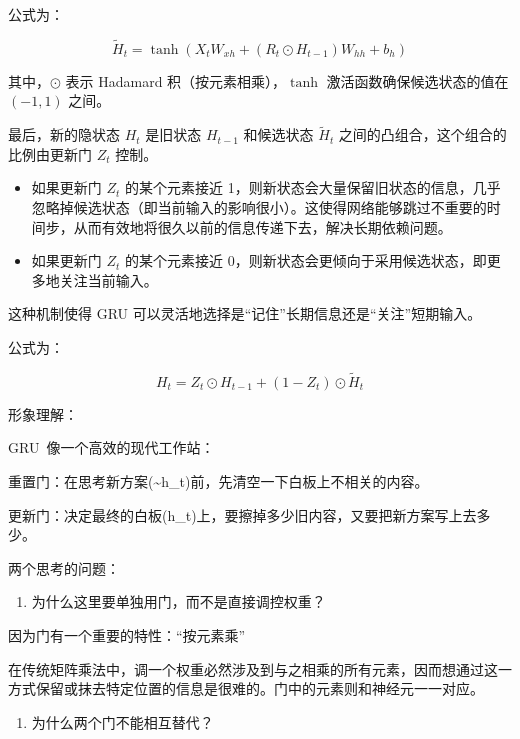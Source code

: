 公式为：

\[
\tilde{H}_t = \tanh(X_t W_{xh} + (R_t \odot H_{t-1})W_{hh} + b_h)
\]

其中，\(\odot\) 表示 Hadamard 积（按元素相乘），\(\tanh\) 激活函数确保候选状态的值在 \((-1, 1)\) 之间。

最后，新的隐状态 \(H_t\) 是旧状态 \(H_{t-1}\) 和候选状态 \(\tilde{H}_t\) 之间的凸组合，这个组合的比例由更新门 \(Z_t\) 控制。

\begin{itemize}
\tightlist
\item
  如果更新门 \(Z_t\) 的某个元素接近 1，则新状态会大量保留旧状态的信息，几乎忽略掉候选状态（即当前输入的影响很小）。这使得网络能够跳过不重要的时间步，从而有效地将很久以前的信息传递下去，解决长期依赖问题。
\item
  如果更新门 \(Z_t\) 的某个元素接近 0，则新状态会更倾向于采用候选状态，即更多地关注当前输入。
\end{itemize}

这种机制使得 GRU 可以灵活地选择是``记住''长期信息还是``关注''短期输入。

公式为：

\[
H_t = Z_t \odot H_{t-1} + (1 - Z_t) \odot \tilde{H}_t
\]

形象理解：

GRU~像一个高效的现代工作站：

重置门：在思考新方案(\textasciitilde h\_t)前，先清空一下白板上不相关的内容。

更新门：决定最终的白板(h\_t)上，要擦掉多少旧内容，又要把新方案写上去多少。

两个思考的问题：

\begin{enumerate}
\def\labelenumi{\arabic{enumi}.}
\tightlist
\item
  为什么这里要单独用门，而不是直接调控权重？
\end{enumerate}

因为门有一个重要的特性：``按元素乘''

在传统矩阵乘法中，调一个权重必然涉及到与之相乘的所有元素，因而想通过这一方式保留或抹去特定位置的信息是很难的。门中的元素则和神经元一一对应。

\begin{enumerate}
\def\labelenumi{\arabic{enumi}.}
\setcounter{enumi}{1}
\tightlist
\item
  为什么两个门不能相互替代？
\end{enumerate}

